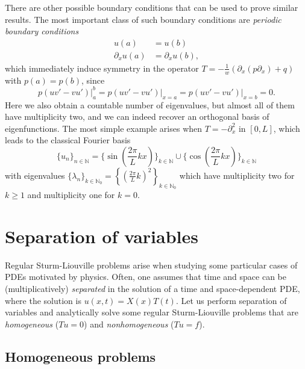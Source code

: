 There are other possible boundary conditions that can be used to prove similar results. The most important class of such boundary conditions are \textit{periodic boundary conditions}
\begin{align*}
    u(a) &= u(b)\\
    \partial_x u(a) &= \partial_x u(b),
\end{align*}
which immediately induce symmetry in the operator $T = -\frac{1}{w}(\partial_x(p\partial_x) + q)$ with $p(a)=p(b)$, since 
\begin{equation*}
    \left.p(uv'-vu')\right|_a^b =  \left.p(uv'-vu') \right|_{x=a} = \left.p(uv'-vu') \right|_{x=b} = 0.
\end{equation*}
Here we also obtain a countable number of eigenvalues, but almost all of them have multiplicity two, and we can indeed recover an orthogonal basis of eigenfunctions. The most simple example arises when $T=-\partial_x^2$ in $[0,L]$, which leads to the classical Fourier basis 
\begin{equation*}
    \{u_n\}_{n\in \mathbb N} = \{\sin\left(\frac{2\pi}{L}kx\right)\}_{k\in\mathbb N} \cup  \{\cos\left(\frac{2\pi}{L}kx\right)\}_{k\in\mathbb N}
\end{equation*}
with eigenvalues $\{\lambda_n\}_{k\in\mathbb{N}_0} = \left\{\left(\frac{2\pi}{L}k\right)^2\right\}_{k\in\mathbb{N}_0}$ which have multiplicity two for $k\geq 1$ and multiplicity one for $k=0$.
\section{Separation of variables}
Regular Sturm-Liouville problems arise when studying some particular cases of PDEs motivated by physics. Often, one assumes that time and space can be (multiplicatively) \textit{separated} in the solution of a time and space-dependent PDE, where the solution is $u(x,t) = X(x)T(t)$. Let us perform separation of variables and analytically solve some regular Sturm-Liouville problems that are \textit{homogeneous} ($Tu=0$) and \textit{nonhomogeneous} ($Tu=f$).
\subsection{Homogeneous problems}
